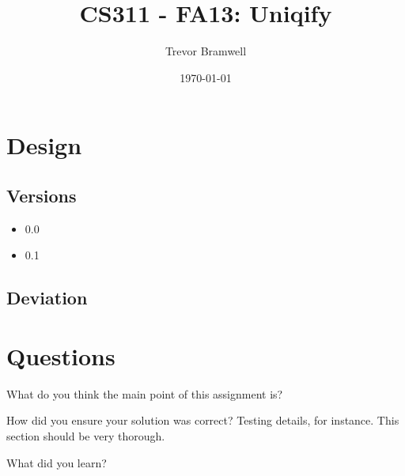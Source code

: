 \documentclass[letterpaper,10pt]{article}
\title{CS311 - FA13: Uniqify}
\date{\today}
\author{Trevor Bramwell}
\begin{document}
\maketitle

\section{Design}

\subsection{Versions}

\begin{itemize}
    \item 0.0 
    \item 0.1 
\end{itemize}

\subsection{Deviation}

\section{Questions}
\begin{description}
  \item  What do you think the main point of this assignment is?

  \item  How did you ensure your solution was correct? Testing details, for
         instance. This section should be very thorough.

  \item  What did you learn?
\end{description}

\newpage

%
%
\end{document}
